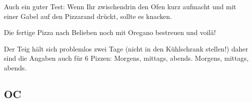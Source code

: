 {  	\noindent Auch ein guter Test: Wenn Ihr zwischendrin den Ofen kurz aufmacht und mit einer Gabel auf den Pizzarand drückt, sollte es knacken.
	\item Die fertige Pizza nach Belieben noch mit Oregano bestreuen und voilà!
	\item Der Teig hält sich problemlos zwei Tage (nicht in den Kühlschrank stellen!) daher sind die Angaben auch für 6 Pizzen: Morgens, mittags, abends. Morgens, mittags, abends.
}


\subsection{OC}
